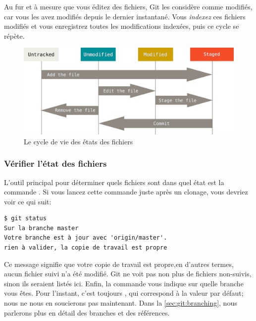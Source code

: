 Au fur et à mesure que vous éditez des fichiers, Git les considère comme modifiés, car vous les avez modifiés depuis le dernier instantané.
Vous \emph{indexez} ces fichiers modifiés et vous enregistrez toutes les modifications indexées, puis ce cycle se répète.

\begin{figure}[!h]
  \centering
  \includegraphics{images/lifecycle}
  \caption{Le cycle de vie des états des fichiers}
  \label{fig:git:lifecycle}
\end{figure}

\subsubsection{Vérifier l'état des fichiers}
\label{sec:git:checking_status}

L'outil principal pour déterminer quels fichiers sont dans quel état est la commande .
Si vous lancez cette commande juste après un clonage, vous devriez voir ce qui suit:
\begin{Schunk}
\begin{Verbatim}
$ git status
Sur la branche master
Votre branche est à jour avec 'origin/master'.
rien à valider, la copie de travail est propre
\end{Verbatim}
\end{Schunk}

Ce message signifie que votre copie de travail est propre,en d'autres termes, aucun fichier suivi n'a été modifié.
Git ne voit pas non plus de fichiers non-suivis, sinon ils seraient listés ici.
Enfin, la commande vous indique sur quelle branche vous êtes.
Pour l'instant, c'est toujours , qui correspond à la valeur par défaut; nous ne nous en soucierons pas maintenant.
Dans la \autoref{sec:git:branching}, nous parlerons plus en détail des branches et des références.

